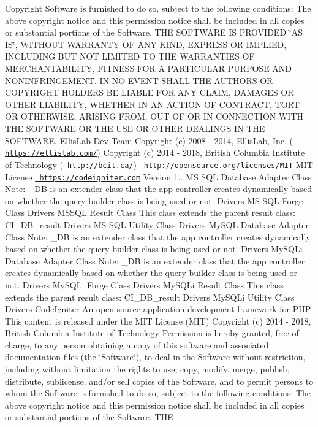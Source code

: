 \begin{DoxyCopyright}{Copyright}
Software is furnished to do so, subject to the following conditions\+: The above copyright notice and this permission notice shall be included in all copies or substantial portions of the Software. T\+HE S\+O\+F\+T\+W\+A\+RE IS P\+R\+O\+V\+I\+D\+ED \char`\"{}\+A\+S I\+S\char`\"{}, W\+I\+T\+H\+O\+UT W\+A\+R\+R\+A\+N\+TY OF A\+NY K\+I\+ND, E\+X\+P\+R\+E\+SS OR I\+M\+P\+L\+I\+ED, I\+N\+C\+L\+U\+D\+I\+NG B\+UT N\+OT L\+I\+M\+I\+T\+ED TO T\+HE W\+A\+R\+R\+A\+N\+T\+I\+ES OF M\+E\+R\+C\+H\+A\+N\+T\+A\+B\+I\+L\+I\+TY, F\+I\+T\+N\+E\+SS F\+OR A P\+A\+R\+T\+I\+C\+U\+L\+AR P\+U\+R\+P\+O\+SE A\+ND N\+O\+N\+I\+N\+F\+R\+I\+N\+G\+E\+M\+E\+NT. IN NO E\+V\+E\+NT S\+H\+A\+LL T\+HE A\+U\+T\+H\+O\+RS OR C\+O\+P\+Y\+R\+I\+G\+HT H\+O\+L\+D\+E\+RS BE L\+I\+A\+B\+LE F\+OR A\+NY C\+L\+A\+IM, D\+A\+M\+A\+G\+ES OR O\+T\+H\+ER L\+I\+A\+B\+I\+L\+I\+TY, W\+H\+E\+T\+H\+ER IN AN A\+C\+T\+I\+ON OF C\+O\+N\+T\+R\+A\+CT, T\+O\+RT OR O\+T\+H\+E\+R\+W\+I\+SE, A\+R\+I\+S\+I\+NG F\+R\+OM, O\+UT OF OR IN C\+O\+N\+N\+E\+C\+T\+I\+ON W\+I\+TH T\+HE S\+O\+F\+T\+W\+A\+RE OR T\+HE U\+SE OR O\+T\+H\+ER D\+E\+A\+L\+I\+N\+GS IN T\+HE S\+O\+F\+T\+W\+A\+RE.  Ellis\+Lab Dev Team  Copyright (c) 2008 -\/ 2014, Ellis\+Lab, Inc. (\href{https://ellislab.com/}{\texttt{ https\+://ellislab.\+com/}})  Copyright (c) 2014 -\/ 2018, British Columbia Institute of Technology (\href{http://bcit.ca/}{\texttt{ http\+://bcit.\+ca/}})  \href{http://opensource.org/licenses/MIT}{\texttt{ http\+://opensource.\+org/licenses/\+M\+IT}} M\+IT License  \href{https://codeigniter.com}{\texttt{ https\+://codeigniter.\+com}}  Version 1..  MS S\+QL Database Adapter Class Note\+: \+\_\+\+DB is an extender class that the app controller creates dynamically based on whether the query builder class is being used or not.  Drivers MS S\+QL Forge Class  Drivers M\+S\+S\+QL Result Class This class extends the parent result class\+: C\+I\+\_\+\+D\+B\+\_\+result  Drivers MS S\+QL Utility Class  Drivers My\+S\+QL Database Adapter Class Note\+: \+\_\+\+DB is an extender class that the app controller creates dynamically based on whether the query builder class is being used or not.  Drivers My\+S\+Q\+Li Database Adapter Class Note\+: \+\_\+\+DB is an extender class that the app controller creates dynamically based on whether the query builder class is being used or not.  Drivers My\+S\+Q\+Li Forge Class  Drivers My\+S\+Q\+Li Result Class This class extends the parent result class\+: C\+I\+\_\+\+D\+B\+\_\+result  Drivers My\+S\+Q\+Li Utility Class  Drivers Code\+Igniter An open source application development framework for P\+HP This content is released under the M\+IT License (M\+IT) Copyright (c) 2014 -\/ 2018, British Columbia Institute of Technology Permission is hereby granted, free of charge, to any person obtaining a copy of this software and associated documentation files (the \char`\"{}\+Software\char`\"{}), to deal in the Software without restriction, including without limitation the rights to use, copy, modify, merge, publish, distribute, sublicense, and/or sell copies of the Software, and to permit persons to whom the Software is furnished to do so, subject to the following conditions\+: The above copyright notice and this permission notice shall be included in all copies or substantial portions of the Software. T\+HE 
\end{DoxyCopyright}
